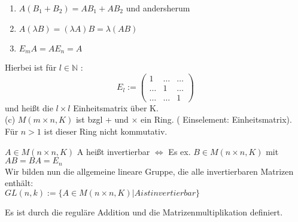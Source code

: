 \documentclass[headsepline,12pt,a4paper]{scrartcl}
\makeatletter
\def\myItem{%
   \@ifnextchar[ \@myItem{\@noitemargtrue\@myItem[\@itemlabel]}}
\def\@myItem[#1]{\item[#1]\mbox{}\\}
\makeatother
\begin{document}
\begin{enumerate}
\item $A(B_1+B_2) = AB_1+AB_2$ und andersherum \\
\item $A(\lambda B) = (\lambda A)B = \lambda (AB)$ \\
\item $E_m A = A E_n = A$ \\
\end{enumerate}

Hierbei ist für $l \in \mathbb{N}$ : \\
$$ E_l:= \begin{pmatrix}
1 & \dots & \dots \\
\dots & 1 & \dots \\
\dots & \dots & 1  
\end{pmatrix}
$$ 
und heißt die $l\times l $ Einheitsmatrix über K. \\

(c) $M(m\times n, K)$ ist bzgl + und $\times$ ein Ring. ( Einselement: Einheitsmatrix). Für $n>1$ ist dieser Ring nicht kommutativ. \\

\newpage

\myItem[10.3] $A \in M(n \times n,K)$
A heißt invertierbar $\Leftrightarrow $ Es ex. $B \in M(n \times n,K)$ mit $AB = BA = E_n$ \\

\myItem[10.4]
Wir bilden nun die allgemeine lineare Gruppe, die alle invertierbaren Matrizen enthält: \\

$GL(n,k):=\{A \in M(n \times n,K) | A ist invertierbar\}$

Es ist durch die reguläre Addition und die Matrizenmultiplikation definiert. \\
\end{document}
